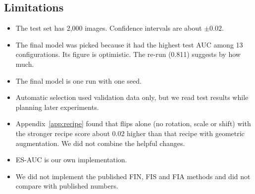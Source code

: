 \documentclass[11pt]{article}
\begin{document}
\begin{table}[t]
\centering\footnotesize
\setlength{\tabcolsep}{4pt}
\resizebox{\linewidth}{!}{}
\caption{Test AUC within demographic groups.}
\label{tab:groups}
\end{table}

\subsection{Limitations}
\begin{itemize}
\item The test set has 2{,}000 images. Confidence intervals are about $\pm0.02$.
\item The final model was picked because it had the highest test AUC among 13 configurations. Its figure is optimistic. The re-run (0.811) suggests by how much.
\item The final model is one run with one seed.
\item Automatic selection used validation data only, but we read test results while planning later experiments.
\item Appendix~\ref{app:recipe} found that flips alone (no rotation, scale or shift) with the stronger recipe score about 0.02 higher than that recipe with geometric augmentation. We did not combine the helpful changes.
\item ES-AUC is our own implementation.
\item We did not implement the published FIN, FIS and FIA methods and did not compare with published numbers.
\end{itemize}

\end{document}
